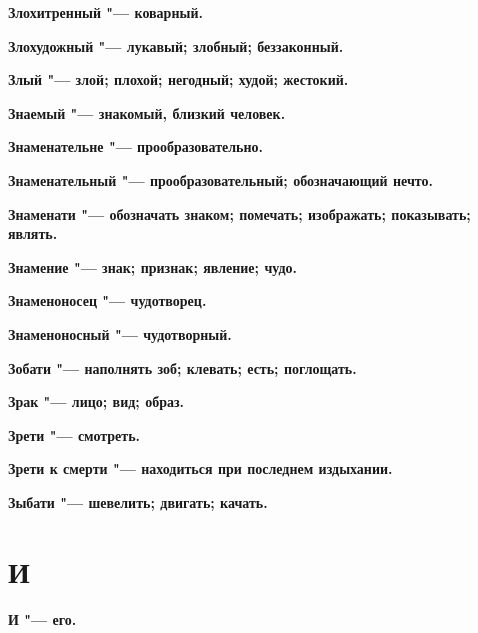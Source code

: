 \begin{mymulticols}{2}
\bfseries Злохитренный\normalfont{} "--- коварный. 




\bfseries Злохудожный\normalfont{} "--- лукавый; злобный; беззаконный. 




\bfseries Злый\normalfont{} "--- злой; плохой; негодный; худой; жестокий. 




\bfseries Знаемый\normalfont{} "--- знакомый, близкий человек. 




\bfseries Знаменательне\normalfont{} "--- прообразовательно. 




\bfseries Знаменательный\normalfont{} "--- прообразовательный; обозначающий нечто. 




\bfseries Знаменати\normalfont{} "--- обозначать знаком; помечать; изображать; показывать; являть. 




\bfseries Знамение\normalfont{} "--- знак; признак; явление; чудо. 




\bfseries Знаменоносец\normalfont{} "--- чудотворец. 




\bfseries Знаменоносный\normalfont{} "--- чудотворный. 




\bfseries Зобати\normalfont{} "--- наполнять зоб; клевать; есть; поглощать. 




\bfseries Зрак\normalfont{} "--- лицо; вид; образ. 




\bfseries Зрети\normalfont{} "--- смотреть. 




\bfseries Зрети к смерти\normalfont{} "--- находиться при последнем издыхании. 




\bfseries Зыбати\normalfont{} "--- шевелить; двигать; качать. 




\section{И}





\bfseries И\normalfont{} "--- его. 





\end{mymulticols}
